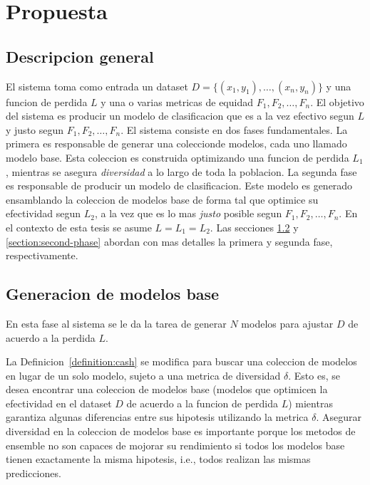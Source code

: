 \chapter{Propuesta}\label{chapter:proposal}

\section{Descripcion general}\label{section:overview}

El sistema toma como entrada un dataset $D = \{(x_1, y_1), \dots , (x_n, y_n)\}$ y una funcion de perdida $L$ y una o varias metricas de equidad $F_1, F_2, \dots, F_n$. El objetivo del sistema es producir un modelo de clasificacion que es a la vez efectivo segun $L$ y justo segun $F_1, F_2, \dots, F_n$. El sistema consiste en dos fases fundamentales. La primera es responsable de generar una coleccionde modelos, cada uno llamado modelo base. Esta coleccion es construida optimizando una funcion de perdida $L_1$, mientras se asegura \emph{diversidad} a lo largo de toda la poblacion. La segunda fase es responsable de producir un modelo de clasificacion. Este modelo es generado ensamblando la coleccion de modelos base de forma tal que optimice su efectividad segun $L_2$, a la vez que es lo mas \emph{justo} posible segun $F_1, F_2, \dots, F_n$. En el contexto de esta tesis se asume $L = L_1 = L_2$. Las secciones \ref{section:first-phase} y \ref{section:second-phase} abordan con mas detalles la primera y segunda fase, respectivamente.


\section{Generacion de modelos base}\label{section:first-phase}


En esta fase al sistema se le da la tarea de generar $N$ modelos para ajustar $D$ de acuerdo a la perdida $L$.

La Definicion~\ref{definition:cash} se modifica para buscar una coleccion de modelos en lugar de un solo modelo, sujeto a una metrica de diversidad $\delta$. Esto es, se desea encontrar una coleccion de modelos base (modelos que optimicen la efectividad en el dataset $D$ de acuerdo a la funcion de perdida $L$) mientras garantiza algunas diferencias entre sus hipotesis utilizando la metrica $\delta$. Asegurar diversidad en la coleccion de modelos base es importante porque los metodos de ensemble no son capaces de mojorar su rendimiento si todos los modelos base tienen exactamente la misma hipotesis, i.e., todos realizan las mismas predicciones.

